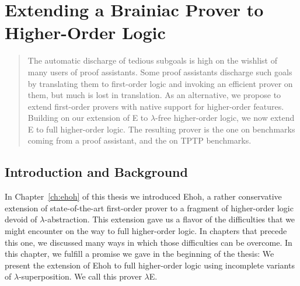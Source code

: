 \chapter{Extending a Brainiac Prover to Higher-Order Logic}
\label{ch:ehoh2}

\newcommand\ehohii{$\lambda$E}





\begin{abstract}%
    The automatic discharge of tedious subgoals is high on the wishlist of many
  users of proof assistants. Some proof assistants discharge such goals
  by translating them to first-order logic and invoking an efficient prover on
  them, but much is lost in translation. As an alternative,
  we propose to extend first-order provers with native support for
  higher-order features. Building on our extension of E to $\lambda$-free
  higher-order logic, we now extend E to full higher-order logic.
  The resulting prover is the  one on benchmarks coming from a
  proof assistant, and the  on TPTP benchmarks.
\end{abstract}

\newpage

\section{Introduction and Background}
\label{sec:ehoh2:introduction}

In Chapter~\ref{ch:ehoh} of this thesis we introduced Ehoh, a rather conservative extension of
state-of-the-art first-order prover to a fragment of higher-order logic devoid of $\lambda$-abstraction. This
extension gave us a flavor of the difficulties that we might encounter on the
way to full higher-order logic. In chapters that precede this one,
we discussed many ways in which those difficulties can be overcome.
In this chapter, we fulfill a promise we gave in the beginning of the thesis: We present the extension of
Ehoh to full higher-order logic using incomplete variants
of $\lambda$-superposition. We call this prover \ehohii.

